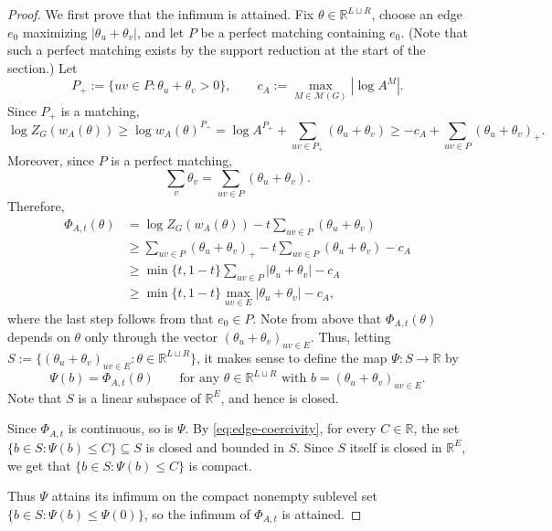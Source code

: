 \documentclass[11pt,reqno,letterpaper]{amsart}
\numberwithin{equation}{section}
\theoremstyle{definition}
\theoremstyle{remark}
\newcommand{\mb}{\mathbb}
\newcommand{\R}{\mathbb R}
\newcommand{\cM}{\mathcal M}
\begin{document}
\begin{proof}
We first prove that the infimum is attained. 
Fix $\theta\in\R^{L\sqcup R}$, choose an edge $e_0$ maximizing
$|\theta_u+\theta_v|$, and let $P$ be a perfect matching containing
$e_0$. (Note that such a perfect matching exists by the support reduction at the start of the section.) Let
\[
  P_+:=\{uv\in P:\theta_u+\theta_v>0\}, \qquad c_A:=\max_{M\in\cM(G)}|\log A^M|.
\]
Since $P_+$ is a matching,
\[
  \log Z_G(w_A(\theta))
  \geq \log w_A(\theta)^{P_+}=\log A^{P_+}+\sum_{uv\in P_+}(\theta_u+\theta_v)
  \geq -c_A+\sum_{uv\in P}(\theta_u+\theta_v)_+.
\]
Moreover, since $P$ is a perfect matching,
\begin{equation*}
  \sum_v\theta_v=\sum_{uv\in P}(\theta_u+\theta_v).
\end{equation*}
Therefore,
\begin{align}
  \Phi_{A,t}(\theta)
  &=
  \log Z_G(w_A(\theta))
  -t\sum_{uv\in P}(\theta_u+\theta_v) \nonumber\\
  &\geq
  \sum_{uv\in P}(\theta_u+\theta_v)_+
  -t\sum_{uv\in P}(\theta_u+\theta_v)
  -c_A \nonumber\\
  &\geq \min\{t,1-t\}
  \sum_{uv\in P}|\theta_u+\theta_v|
  -c_A\nonumber\\
  &\geq \min\{t,1-t\}
  \max_{uv\in E}|\theta_u+\theta_v|
  -c_A,
  \label{eq:edge-coercivity}
\end{align}
where the last step follows from that $e_0\in P$.
Note from above that $\Phi_{A,t}(\theta)$ depends on $\theta$ only through the
vector
$
  (\theta_u+\theta_v)_{uv\in E}.
$
Thus, letting $S:=\{(\theta_u+\theta_v)_{uv\in E}: \theta\in \mb{R}^{L \sqcup R}\}$, it makes sense to define the map $\Psi:S\to\R$ by
\[
\Psi(b)=\Phi_{A,t}(\theta)\qquad  \text{for any $\theta\in \R^{L\sqcup R}$ with $b=(\theta_u+\theta_v)_{uv\in E}$.}
\]
 Note that $S$ is a linear subspace of $\R^{E}$, and hence is closed.

Since $\Phi_{A,t}$ is continuous, so is $\Psi$.
By \cref{eq:edge-coercivity},
for every $C\in\R$, the set $\{b \in S:\Psi(b)\leq C\}\subseteq S$ is closed and bounded in $S$. Since $S$ itself is closed in $\R^{E}$, we get that $\{b \in S:\Psi(b)\leq C\}$ is compact.

Thus $\Psi$ attains its infimum on the compact nonempty sublevel set
$\{b\in S:\Psi(b)\leq\Psi(0)\}$, so the infimum of $\Phi_{A,t}$ is attained.


\end{proof}
\end{document}
